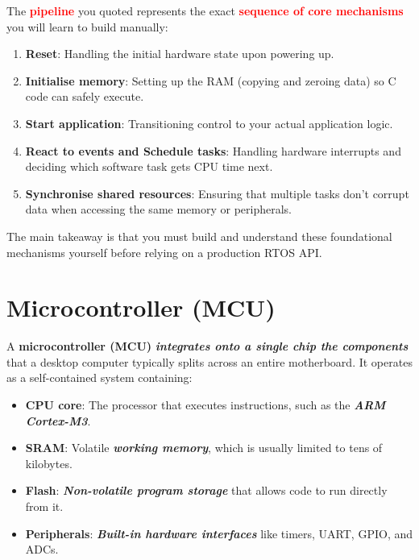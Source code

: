 The \textbf{\textcolor{red}{pipeline}} you quoted represents the exact \textbf{\textcolor{red}{sequence of core mechanisms}} you will learn to build manually:

\begin{enumerate}
    \item \textbf{Reset}: Handling the initial hardware state upon powering up.
    
    \item \textbf{Initialise memory}: Setting up the RAM (copying and zeroing data) so C code can safely execute.
    
    \item \textbf{Start application}: Transitioning control to your actual application logic.
    
    \item \textbf{React to events and Schedule tasks}: Handling hardware interrupts and deciding which software task gets CPU time next.
    
    \item \textbf{Synchronise shared resources}: Ensuring that multiple tasks don't corrupt data when accessing the same memory or peripherals.
\end{enumerate}

The main takeaway is that you must build and understand these foundational mechanisms yourself before relying on a production RTOS API. 

\section{Microcontroller (MCU)}
A \textbf{microcontroller (MCU)} \textbf{\textit{integrates onto a single chip the components}} that a desktop computer typically splits across an entire motherboard. It operates as a self-contained system containing:
\begin{itemize}
    \item \textbf{CPU core}: The processor that executes instructions, such as the \textbf{\textit{ARM Cortex-M3}}.
    
    \item \textbf{SRAM}: Volatile \textbf{\textit{working memory}}, which is usually limited to tens of kilobytes.
    
    \item \textbf{Flash}: \textbf{\textit{Non-volatile program storage}} that allows code to run directly from it.
    
    \item \textbf{Peripherals}: \textbf{\textit{Built-in hardware interfaces}} like timers, UART, GPIO, and ADCs.
\end{itemize}

